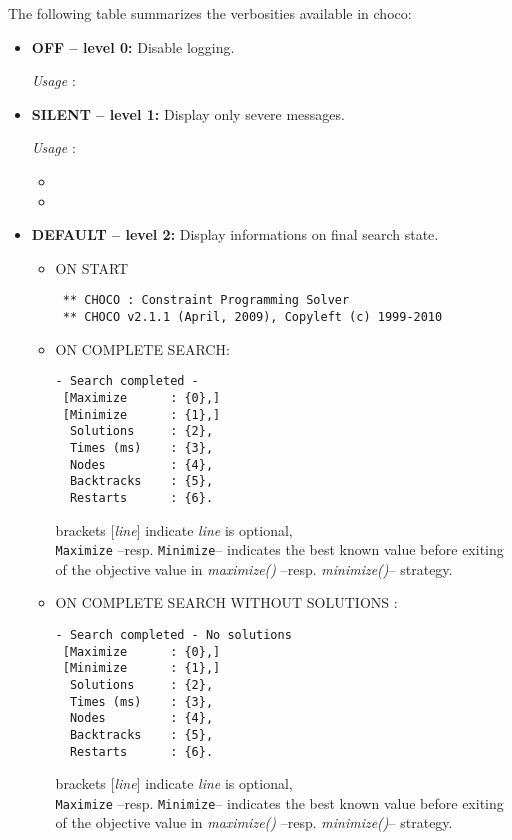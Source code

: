 The following table summarizes the verbosities available in choco: 
\begin{itemize}
	\item \textbf{OFF -- level 0:} Disable logging.	 

	\vspace{0.2cm} 
	\textit{Usage} :  
	
	\item \textbf{SILENT -- level 1:} Display only severe messages.
	
	\vspace{0.2cm} 
	\textit{Usage} : 
		\begin{itemize}
		\item {}
		\item {}
		\end{itemize}
	
	\item \textbf{DEFAULT -- level 2:} Display informations on final search state.
		\begin{itemize}
			\item ON START
\begin{lstlisting}
 ** CHOCO : Constraint Programming Solver
 ** CHOCO v2.1.1 (April, 2009), Copyleft (c) 1999-2010
 \end{lstlisting}
			\item ON COMPLETE SEARCH:
				\begin{lstlisting}
- Search completed -
 [Maximize		: {0},]
 [Minimize		: {1},]
  Solutions		: {2},
  Times (ms)	: {3},
  Nodes			: {4},
  Backtracks	: {5},
  Restarts		: {6}.
  \end{lstlisting}
	brackets [\textit{line}] indicate \textit{line} is optional,\\
 	\texttt{Maximize} --resp. \texttt{Minimize}-- indicates the best known value before exiting of the objective value in \textit{maximize()} --resp. \textit{minimize()}-- strategy.

			\item ON COMPLETE SEARCH WITHOUT SOLUTIONS :
				\begin{lstlisting}
- Search completed - No solutions
 [Maximize		: {0},]
 [Minimize		: {1},]
  Solutions		: {2},
  Times (ms)	: {3},
  Nodes			: {4},
  Backtracks	: {5},
  Restarts		: {6}.
\end{lstlisting}
	brackets [\textit{line}] indicate \textit{line} is optional,\\
 	\texttt{Maximize} --resp. \texttt{Minimize}-- indicates the best known value before exiting of the objective value in \textit{maximize()} --resp. \textit{minimize()}-- strategy.


\end{itemize}
\end{itemize}
